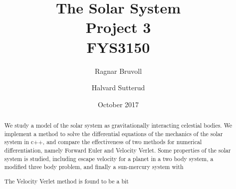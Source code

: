 \documentclass[10pt]{article}
\begin{document}
\title{The Solar System
\\ Project 3
\\ FYS3150}
\author{Ragnar Bruvoll \and Halvard Sutterud}
\date{October 2017}
\maketitle{\begin{center}\end{center}}
\thispagestyle{empty}

\begin{abstract}
    We study a model of the solar system as gravitationally interacting
    celestial bodies.  We implement a method to solve the differential
    equations of the mechanics of the solar system in c++, and compare the
    effectiveness of two methods for numerical differentiation, namely
    Forward Euler and Velocity Verlet. Some properties of the solar system
    is studied, including escape velocity for a planet in a two body
    system, a modified three body problem, and finally a sun-mercury system
    with 
    
    The Velocity Verlet method is found to be a bit 
\end{abstract}

\tableofcontents

\newpage
{}
\end{document}
